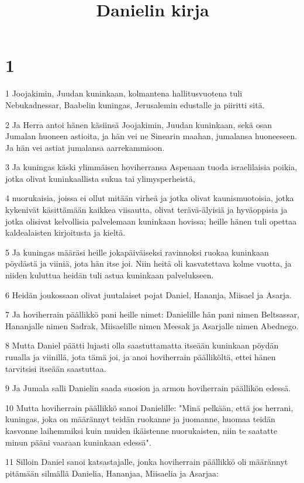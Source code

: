 

\title{Danielin kirja}


\chapter{1}

\par 1 Joojakimin, Juudan kuninkaan, kolmantena hallitusvuotena tuli Nebukadnessar, Baabelin kuningas, Jerusalemin edustalle ja piiritti sitä.
\par 2 Ja Herra antoi hänen käsiinsä Joojakimin, Juudan kuninkaan, sekä osan Jumalan huoneen astioita, ja hän vei ne Sinearin maahan, jumalansa huoneeseen. Ja hän vei astiat jumalansa aarrekammioon.
\par 3 Ja kuningas käski ylimmäisen hoviherransa Aspenaan tuoda israelilaisia poikia, jotka olivat kuninkaallista sukua tai ylimysperheistä,
\par 4 nuorukaisia, joissa ei ollut mitään virheä ja jotka olivat kaunismuotoisia, jotka kykenivät käsittämään kaikkea viisautta, olivat terävä-älyisiä ja hyväoppisia ja jotka olisivat kelvollisia palvelemaan kuninkaan hovissa; heille hänen tuli opettaa kaldealaisten kirjoitusta ja kieltä.
\par 5 Ja kuningas määräsi heille jokapäiväiseksi ravinnoksi ruokaa kuninkaan pöydästä ja viiniä, jota hän itse joi. Niin heitä oli kasvatettava kolme vuotta, ja niiden kuluttua heidän tuli astua kuninkaan palvelukseen.
\par 6 Heidän joukossaan olivat juutalaiset pojat Daniel, Hananja, Miisael ja Asarja.
\par 7 Ja hoviherrain päällikkö pani heille nimet: Danielille hän pani nimen Beltsassar, Hananjalle nimen Sadrak, Miisaelille nimen Meesak ja Asarjalle nimen Abednego.
\par 8 Mutta Daniel päätti lujasti olla saastuttamatta itseään kuninkaan pöydän ruualla ja viinillä, jota tämä joi, ja anoi hoviherrain päälliköltä, ettei hänen tarvitsisi itseään saastuttaa.
\par 9 Ja Jumala salli Danielin saada suosion ja armon hoviherrain päällikön edessä.
\par 10 Mutta hoviherrain päällikkö sanoi Danielille: "Minä pelkään, että jos herrani, kuningas, joka on määrännyt teidän ruokanne ja juomanne, huomaa teidän kasvonne laihemmiksi kuin muiden ikäistenne nuorukaisten, niin te saatatte minun pääni vaaraan kuninkaan edessä".
\par 11 Silloin Daniel sanoi katsastajalle, jonka hoviherrain päällikkö oli määrännyt pitämään silmällä Danielia, Hananjaa, Miisaelia ja Asarjaa:
